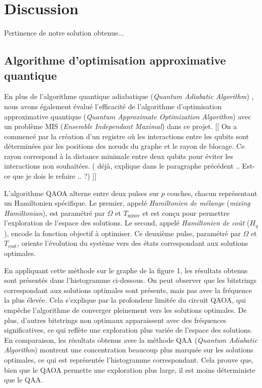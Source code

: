 \documentclass[11pt]{article}
\begin{document}
\section{Discussion}
Pertinence de notre solution obtenue...

\subsection{Algorithme d'optimisation approximative quantique}
En plus de l'algorithme quantique adiabatique (\textit{Quantum Adiabatic Algorithm}) , nous avons également évalué l'efficacité de l'algorithme d'optimisation approximative quantique (\textit{Quantum Approximate Optimization Algorithm}) avec un problème MIS (\textit{Ensemble Independant Maximal}) dans ce projet. 
[[ On a commencé par la création d'un registre où les interactions entre les qubits sont déterminées par les positions des nœuds du graphe et le rayon de blocage. Ce rayon correspond à la distance minimale entre deux qubits pour éviter les interactions non souhaitées. ( déjà, explique dans le paragraphe précédent .. Est-ce que je dois le refaire .. ?) ]] 
 
L'algorithme QAOA alterne entre deux pulses sur \( p \) couches, chacun représentant un Hamiltonien spécifique. Le premier, appelé \textit{Hamiltonien de mélange} (\textit{mixing Hamiltonian}), est paramétré par \( \Omega \) et \( T_{\text{mixer}} \) et est conçu pour permettre l'exploration de l'espace des solutions. Le second, appelé \textit{Hamiltonien de coût} (\( H_q \)), encode la fonction objectif à optimiser. Ce deuxième pulse, paramétré par \( \Omega \) et \( T_{\text{cost}} \), oriente l'évolution du système vers des états correspondant aux solutions optimales.

En appliquant cette méthode sur le graphe de la figure 1, les résultats obtenus sont présentés dans l'histogramme ci-dessous. On peut observer que les bitstrings correspondant aux solutions optimales sont présents, mais pas avec la fréquence la plus élevée. Cela s'explique par la profondeur limitée du circuit QAOA, qui empêche l'algorithme de converger pleinement vers les solutions optimales. De plus, d'autres bitstrings non optimaux apparaissent avec des fréquences significatives, ce qui reflète une exploration plus variée de l'espace des solutions.
En comparaison, les résultats obtenus avec la méthode QAA (\textit{Quantum Adiabatic Algorithm}) montrent une concentration beaucoup plus marquée sur les solutions optimales, ce qui est représentée l'histogramme correspondant. Cela prouve que, bien que le QAOA permette une exploration plus large, il est moins déterministe que le QAA.
\end{document}
